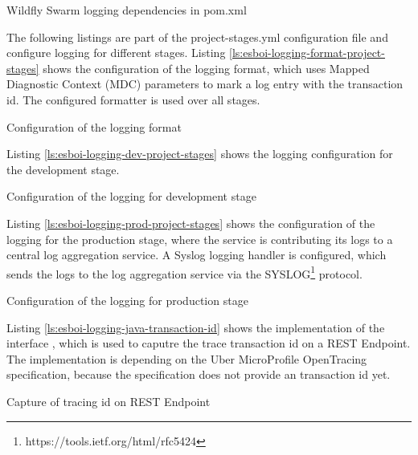 \begin{listing}
	\caption{Wildfly Swarm logging dependencies in pom.xml}
	\label{ls:esboi-logging-pom}
\end{listing}

The following listings are part of the project-stages.yml configuration file and configure logging for different stages. Listing \vref{ls:esboi-logging-format-project-stages} shows the configuration of the logging format, which uses Mapped Diagnostic Context (MDC) parameters to mark a log entry with the transaction id. The configured formatter is used over all stages.

\begin{listing}
	\caption{Configuration of the logging format}
	\label{ls:esboi-logging-format-project-stages}
\end{listing}

Listing \vref{ls:esboi-logging-dev-project-stages} shows the logging configuration for the development stage.

\begin{listing}
	\caption{Configuration of the logging for development stage}
	\label{ls:esboi-logging-dev-project-stages}
\end{listing}

Listing \vref{ls:esboi-logging-prod-project-stages} shows the configuration of the logging for the production stage, where the service is contributing its logs to a central log aggregation service. A Syslog logging handler is configured, which sends the logs to the log aggregation service via the SYSLOG\footnote{https://tools.ietf.org/html/rfc5424} protocol.

\begin{listing}
	\caption{Configuration of the logging for production stage}
	\label{ls:esboi-logging-prod-project-stages}
\end{listing}

Listing \vref{ls:esboi-logging-java-transaction-id} shows the implementation of the interface , which is used to caputre the trace transaction id on a REST Endpoint. The implementation is depending on the Uber MicroProfile OpenTracing specification, because the specification does not provide an transaction id yet.

\begin{listing}
	\caption{Capture of tracing id on REST Endpoint}
	\label{ls:esboi-logging-java-transaction-id}
\end{listing} 

